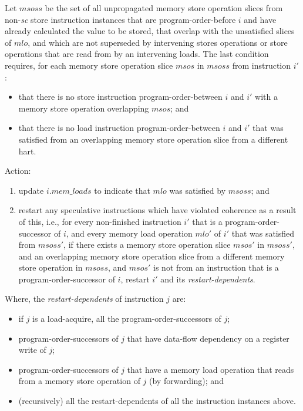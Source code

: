 Let $msoss$ be the set of all unpropagated memory store operation slices from non-{\em sc} store instruction instances that are program-order-before $i$ and have already calculated the value to be stored, that overlap with the unsatisfied slices of $mlo$, and which are not superseded by intervening stores operations or store operations that are read from by an intervening loads.
The last condition requires, for each memory store operation slice $msos$ in $msoss$ from instruction $i'$:
\begin{itemize}
\item that there is no store instruction program-order-between $i$ and $i'$ with a memory store operation overlapping $msos$; and
\item that there is no load instruction program-order-between $i$ and $i'$ that was satisfied from an overlapping memory store operation slice from a different hart.
\end{itemize}
Action:
\begin{enumerate}
\item update $i.\textit{mem\_loads}$ to indicate that $mlo$ was satisfied by $msoss$; and
\item restart any speculative instructions which have violated coherence as a result of this, i.e., for every non-finished instruction $i'$ that is a program-order-successor of $i$, and every memory load operation $mlo'$ of $i'$ that was satisfied from $msoss'$, if there exists a memory store operation slice $msos'$ in $msoss'$, and an overlapping memory store operation slice from a different memory store operation in $msoss$, and $msos'$ is not from an instruction that is a program-order-successor of $i$, restart $i'$ and its {\em restart-dependents}.
\end{enumerate}
Where, the {\em restart-dependents} of instruction $j$ are:
\begin{itemize}
\item if $j$ is a load-acquire, all the program-order-successors of $j$;
\item program-order-successors of $j$ that have data-flow dependency on a register write of $j$;
\item program-order-successors of $j$ that have a memory load operation that reads from a memory store operation of $j$ (by forwarding); and
\item (recursively) all the restart-dependents of all the instruction instances above.
\end{itemize}

